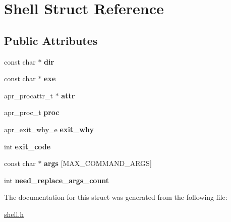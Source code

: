 \hypertarget{structShell}{}\section{Shell Struct Reference}
\label{structShell}
\subsection*{Public Attributes}
\begin{DoxyCompactItemize}
\item 
\hypertarget{structShell_af7f22d5f2b77da8d116c3c56799da8df}{}const char $\ast$ {\bfseries dir}\label{structShell_af7f22d5f2b77da8d116c3c56799da8df}

\item 
\hypertarget{structShell_aa383471cfa47390f167c9ccf20f96b1b}{}const char $\ast$ {\bfseries exe}\label{structShell_aa383471cfa47390f167c9ccf20f96b1b}

\item 
\hypertarget{structShell_ac69162f44ce6c9a5b1e942d59a0f564e}{}apr\+\_\+procattr\+\_\+t $\ast$ {\bfseries attr}\label{structShell_ac69162f44ce6c9a5b1e942d59a0f564e}

\item 
\hypertarget{structShell_ab344de6664e18cea93fac216148cda0e}{}apr\+\_\+proc\+\_\+t {\bfseries proc}\label{structShell_ab344de6664e18cea93fac216148cda0e}

\item 
\hypertarget{structShell_a4d87736ab735660ffdc6addc55cda406}{}apr\+\_\+exit\+\_\+why\+\_\+e {\bfseries exit\+\_\+why}\label{structShell_a4d87736ab735660ffdc6addc55cda406}

\item 
\hypertarget{structShell_a6d3a37fb42f08d96c562d7d05eacd293}{}int {\bfseries exit\+\_\+code}\label{structShell_a6d3a37fb42f08d96c562d7d05eacd293}

\item 
\hypertarget{structShell_a5c11ff22f0e7d22527ce3f40812adb2c}{}const char $\ast$ {\bfseries args} \mbox{[}M\+A\+X\+\_\+\+C\+O\+M\+M\+A\+N\+D\+\_\+\+A\+R\+G\+S\mbox{]}\label{structShell_a5c11ff22f0e7d22527ce3f40812adb2c}

\item 
\hypertarget{structShell_aa69f8cf1e84550e2aab58f34db08f4db}{}int {\bfseries need\+\_\+replace\+\_\+args\+\_\+count}\label{structShell_aa69f8cf1e84550e2aab58f34db08f4db}

\end{DoxyCompactItemize}


The documentation for this struct was generated from the following file\+:\begin{DoxyCompactItemize}
\item 
\hyperlink{shell_8h}{shell.\+h}\end{DoxyCompactItemize}

